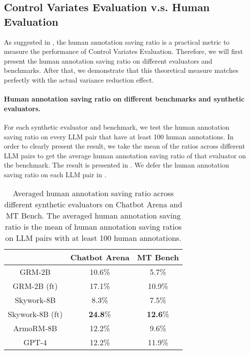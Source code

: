 \subsection{Control Variates Evaluation v.s. Human Evaluation}
\label{sec:exp_cv_human} 
As suggested in , the human annotation saving ratio is a practical metric to measure the performance of Control Variates Evaluation. Therefore, we will first present the human annotation saving ratio on different evaluators and benchmarks. After that, we demonstrate that this theoretical measure matches perfectly with the actual variance reduction effect. 

\paragraph{Human annotation saving ratio on different benchmarks and synthetic evaluators.}
For each synthetic evaluator and benchmark, we test the human annotation saving ratio on every LLM pair that have at least 100 human annotations. In order to clearly present the result, we take the mean of the ratios across different LLM pairs to get the average human annotation saving ratio of that evaluator on the benchmark. The result is presented in . We defer the human annotation saving ratio on each LLM pair in .

\begin{table}[t]
    \centering
    \caption{Averaged human annotation saving ratio across different synthetic evaluators on Chatbot Arena and MT Bench. The averaged human annotation saving ratio is the mean of human annotation saving ratios on LLM pairs with at least 100 human annotations. }
    \vskip 0.15in
    \begin{tabular}{ccc}
    \toprule
       & Chatbot Arena & MT Bench\\
    \hline
     GRM-2B & 10.6\% & 5.7\% \\
    GRM-2B (ft) & 17.1\% & 10.9\% \\
     Skywork-8B & 8.3\% & 7.5\% \\
     Skywork-8B (ft)& \textbf{24.8}\% & \textbf{12.6}\% \\
     ArmoRM-8B & 12.2\% & 9.6\% \\
     GPT-4 & 12.2\% & 11.9\% \\
     \bottomrule
    \end{tabular}
    \label{tab:result_save}
\end{table}




